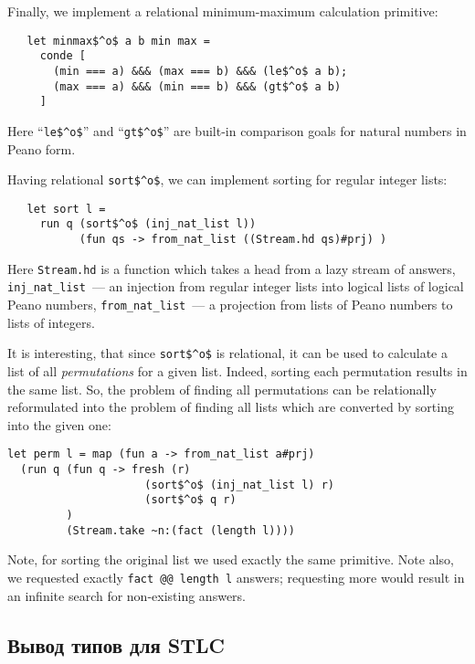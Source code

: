 Finally, we implement a relational minimum-maximum calculation
primitive:

\begin{lstlisting}
   let minmax$^o$ a b min max =
     conde [
       (min === a) &&& (max === b) &&& (le$^o$ a b);
       (max === a) &&& (min === b) &&& (gt$^o$ a b)
     ]
\end{lstlisting}

Here ``\lstinline|le$^o$|'' and ``\lstinline|gt$^o$|'' are built-in comparison goals for natural numbers in Peano form.

Having relational \lstinline|sort$^o$|, we can implement sorting for regular integer lists:

\begin{lstlisting}
   let sort l =
     run q (sort$^o$ (inj_nat_list l))
           (fun qs -> from_nat_list ((Stream.hd qs)#prj) )
\end{lstlisting}

Here \lstinline|Stream.hd| is a function which takes a head from a lazy stream of answers,
\lstinline|inj_nat_list|~--- an injection from regular integer lists into logical lists of logical Peano numbers,
\lstinline|from_nat_list|~--- a projection from lists of Peano numbers to lists of integers.

It is interesting, that since \lstinline|sort$^o$| is
relational, it can be used to calculate a list of all \emph{permutations}
for a given list. Indeed, sorting each permutation results in the same list.
So, the problem of finding all permutations can be relationally reformulated into
the problem of finding all lists which are converted by sorting into the given one:

\begin{lstlisting}
let perm l = map (fun a -> from_nat_list a#prj)
  (run q (fun q -> fresh (r)
                     (sort$^o$ (inj_nat_list l) r)
                     (sort$^o$ q r)
         )
         (Stream.take ~n:(fact (length l))))
\end{lstlisting}

Note, for sorting the original list we used exactly the same primitive. Note also,
we requested exactly \lstinline|fact @@ length l| answers; requesting more
would result in an infinite search for non-existing answers.

\subsection{Вывод типов для STLC}

